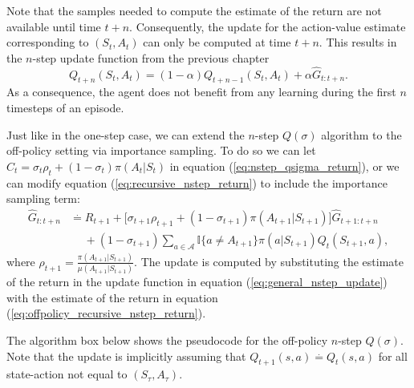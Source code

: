 Note that the samples needed to compute the estimate of the return are not available until time $t+n$.
Consequently, the update for the action-value estimate corresponding to $(S_t, A_t)$ can only be computed at time $t+n$.
This results in the $n$-step update function from the previous chapter
%
\begin{equation}
\label{eq:general_nstep_update}
Q_{t+n}(S_t, A_t) = (1-\alpha)Q_{t+n-1}(S_t,A_t) + \alpha \hat{G}_{t:t+n}.
\end{equation}
As a consequence, the agent does not benefit from any learning during the first $n$ timesteps of an episode.

Just like in the one-step case, we can extend the $n$-step $Q(\sigma)$ algorithm to the off-policy setting via importance sampling.
To do so we can let $C_t = \sigma_t \rho_t + (1-\sigma_t)\pi(A_t|S_t)$ in equation (\ref{eq:nstep_qsigma_return}), or we can modify equation (\ref{eq:recursive_nstep_return}) to include the importance sampling term:
%
\begin{align}
\label{eq:offpolicy_recursive_nstep_return}
\hat{G}_{t:t+n} &\overset{.}{=} R_{t+1} + \big[ \sigma_{t+1} \rho_{t+1} + (1-\sigma_{t+1})\pi(A_{t+1}|S_{t+1}) \big]
	\hat{G}_{t+1:t+n} \nonumber \\
%
& \hspace{15pt}
	+ (1-\sigma_{t+1}) \sum_{a \in \mathcal{A}} \mathbb{I}\{ a \neq A_{t+1} \} \pi(a|S_{t+1}) 
    Q_{t}(S_{t+1}, a),
\end{align}
%
where $\rho_{t+1} = \frac{\pi(A_{t+1}|S_{t+1})}{\mu(A_{t+1}|S_{t+1})}$.
The update is computed by substituting the estimate of the return in the update function in equation (\ref{eq:general_nstep_update}) with the estimate of the return in equation (\ref{eq:offpolicy_recursive_nstep_return}).

The algorithm box below shows the pseudocode for the off-policy $n$-step $Q(\sigma)$.
Note that the update is implicitly assuming that $Q_{t+1}(s,a) \overset{.}{=} Q_t(s,a)$ for all state-action not equal to $(S_\tau, A_\tau)$.

